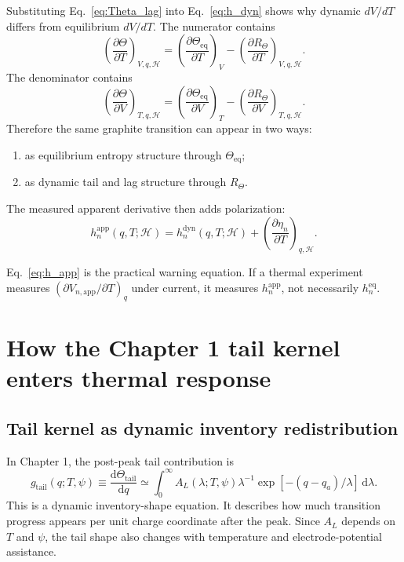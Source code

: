 \documentclass[11pt,a4paper]{article}
\newcommand{\dd}{\mathrm{d}}
\newcommand{\eqs}{\mathrm{eq}}
\newcommand{\dyn}{\mathrm{dyn}}
\newcommand{\app}{\mathrm{app}}
\newcommand{\tail}{\mathrm{tail}}
\newcommand{\calH}{\mathcal H}
\begin{document}
Substituting Eq.~\eqref{eq:Theta_lag} into Eq.~\eqref{eq:h_dyn} shows why dynamic \(dV/dT\) differs from
equilibrium \(dV/dT\). The numerator contains
\begin{equation}
\left(\frac{\partial\Theta}{\partial T}\right)_{V,q,\calH}
=
\left(\frac{\partial\Theta_{\eqs}}{\partial T}\right)_V
-
\left(\frac{\partial R_{\Theta}}{\partial T}\right)_{V,q,\calH}.
\label{eq:Theta_T_split}
\end{equation}
The denominator contains
\begin{equation}
\left(\frac{\partial\Theta}{\partial V}\right)_{T,q,\calH}
=
\left(\frac{\partial\Theta_{\eqs}}{\partial V}\right)_T
-
\left(\frac{\partial R_{\Theta}}{\partial V}\right)_{T,q,\calH}.
\label{eq:Theta_V_split}
\end{equation}
Therefore the same graphite transition can appear in two ways:
\begin{enumerate}[leftmargin=2em]
\item as equilibrium entropy structure through \(\Theta_{\eqs}\);
\item as dynamic tail and lag structure through \(R_{\Theta}\).
\end{enumerate}
The measured apparent derivative then adds polarization:
\begin{equation}
h_n^{\app}(q,T;\calH)
=
h_n^{\dyn}(q,T;\calH)
+
\left(\frac{\partial \eta_n}{\partial T}\right)_{q,\calH}.
\label{eq:h_app}
\end{equation}

Eq.~\eqref{eq:h_app} is the practical warning equation. If a thermal experiment measures
\((\partial V_{n,\app}/\partial T)_q\) under current, it measures \(h_n^{\app}\), not necessarily
\(h_n^{\eqs}\).

\section{How the Chapter 1 tail kernel enters thermal response}\label{sec:tail_thermal}

\subsection{Tail kernel as dynamic inventory redistribution}\label{sec:tail_inventory}

In Chapter 1, the post-peak tail contribution is
\begin{equation}
g_{\tail}(q;T,\psi)
\equiv
\frac{\dd\Theta_{\tail}}{\dd q}
\simeq
\int_0^\infty
A_L(\lambda;T,\psi)\lambda^{-1}
\exp[-(q-q_a)/\lambda]\,\dd\lambda.
\label{eq:g_tail}
\end{equation}
This is a dynamic inventory-shape equation. It describes how much transition progress appears per unit
charge coordinate after the peak. Since \(A_L\) depends on \(T\) and \(\psi\), the tail shape also changes
with temperature and electrode-potential assistance.
\end{document}

